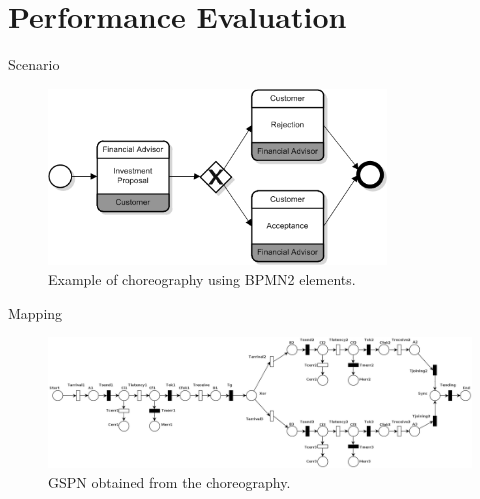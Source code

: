 \documentclass[xcolor=svgnames]{beamer}
\begin{document}
\section{Performance Evaluation}
  \begin{frame}{Scenario}
    \begin{figure}[!h]
    	\centering
    	\includegraphics[width=0.8\textwidth]{BPMNChoreographyExample.png}
    	\caption{Example of choreography using BPMN2 elements.}
    \end{figure}
  \end{frame}


  \begin{frame}{Mapping}
    \begin{figure}[!h]
    	\centering
    	\includegraphics[width=1.0\textwidth]{BPMNChoreographyExample-QoS.png}
    	\caption{GSPN obtained from the choreography.}
    \end{figure}
  \end{frame}
\end{document}
